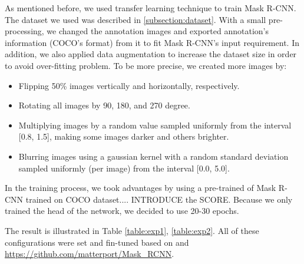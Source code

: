 	As mentioned before, we used transfer learning technique to train Mask R-CNN. The dataset we used was described in \ref{subsection:dataset}. With a small pre-processing, we changed the annotation images and exported annotation's information (COCO's format) from it to fit Mask R-CNN's input requirement. In addition, we also applied data augmentation to increase the dataset size in order to avoid over-fitting problem. To be more precise, we created more images by:
	
	\begin{itemize}
		\item Flipping 50\% images vertically and horizontally, respectively.
		\item Rotating all images by 90, 180, and 270 degree.
		\item Multiplying images by a random value sampled uniformly from the interval [0.8, 1.5], making some images darker and others brighter.
		\item Blurring images using a gaussian kernel with a random standard deviation sampled uniformly (per image) from the interval [0.0, 5.0].
	\end{itemize}
	
	In the training process, we took advantages by using a pre-trained of Mask R-CNN trained on COCO dataset.... INTRODUCE the SCORE. Because we only trained the head of the network, we decided to use 20-30 epochs.
	
	
	The result is illustrated in Table \ref{table:exp1}, \ref{table:exp2}. All of these configurations were set and fin-tuned based on \cite{maskrcnn} and \url{https://github.com/matterport/Mask_RCNN}.
	

